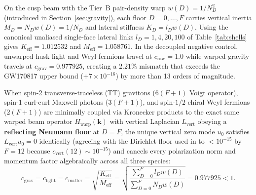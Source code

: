 On the cusp beam with the Tier~B pair-density warp $w(D) = 1/N_D^2$ (introduced in Section~\ref{sec:gravity}),
each floor $D = 0, \ldots, F$ carries vertical inertia $M_D = N_D w(D) = 1/N_D$ and lateral stiffness
$K_D = l_D w(D)$. Using the canonical unaliased single-face lateral links \mbox{$l_D = 1, 4, 20, 100$} of
Table~\ref{tab:shells} gives $K_{\mathrm{eff}} = 1.012532$ and $M_{\mathrm{eff}} = 1.058761$. In the decoupled
negative control, unwarped husk light and Weyl fermions travel at $c_{\mathrm{raw}} = 1.0$ while warped gravity travels
at $c_{\mathrm{grav}} = 0.977925$, creating a $2.21\%$ mismatch that exceeds the GW170817 upper bound ($+7 \times
10^{-16}$) by more than 13 orders of magnitude.

When spin-2 transverse-traceless (TT) gravitons ($6(F+1)$ Voigt operator), spin-1 curl-curl Maxwell photons ($3(F+1)$),
and spin-$1/2$ chiral Weyl fermions ($2(F+1)$) are minimally coupled via Kronecker products to the exact same warped
beam operator $H_{\mathrm{warp}}(\mathbf{k})$ with vertical Laplacian $L_{\mathrm{vert}}$ obeying a \textbf{reflecting
Neumann floor} at $D = F$, the unique vertical zero mode $u_0$ satisfies $L_{\mathrm{vert}} u_0 = 0$ identically
(agreeing with the Dirichlet floor used in  to $< 10^{-15}$ by $F = 12$ because
$c_{\mathrm{vert}}(12) \sim 10^{-15}$) and cancels every polarization norm and momentum factor algebraically across all
three species:
\begin{equation}
c_{\mathrm{grav}} = c_{\mathrm{light}} = c_{\mathrm{matter}}
= \sqrt{\frac{K_{\mathrm{eff}}}{M_{\mathrm{eff}}}}
= \sqrt{\frac{\sum_{D=0}^{F} l_D w(D)}{\sum_{D=0}^{F} N_D w(D)}}
= 0.977925 < 1.
\label{eq:speed-lock}
\end{equation}

